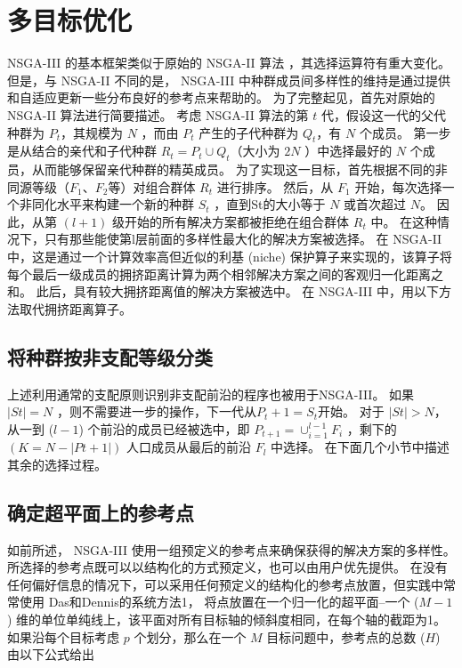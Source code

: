 \section{多目标优化}
NSGA-III 的基本框架类似于原始的 NSGA-II 算法 \cite{NSGA2}，其选择运算符有重大变化。
但是，与 NSGA-II 不同的是， NSGA-III 中种群成员间多样性的维持是通过提供和自适应更新一些分布良好的参考点来帮助的。
为了完整起见，首先对原始的 NSGA-II 算法进行简要描述。
考虑 NSGA-II 算法的第 $t$ 代，假设这一代的父代种群为 $P_t$，其规模为 $N$ ，而由 $P_t$ 产生的子代种群为 $Q_t$，有 $N$ 个成员。
第一步是从结合的亲代和子代种群 $R_t = P_t \cup Q_t$（大小为 $2N$ ）中选择最好的 $N$ 个成员，从而能够保留亲代种群的精英成员。
为了实现这一目标，首先根据不同的非同源等级（$F_1$、$F_2$等）对组合群体 $R_t$ 进行排序。
然后，从 $F_1$ 开始，每次选择一个非同化水平来构建一个新的种群 $S_t$ ，直到St的大小等于 $N$ 或首次超过 $N$。
因此，从第 $(l+1)$ 级开始的所有解决方案都被拒绝在组合群体 $R_t$ 中。
在这种情况下，只有那些能使第l层前面的多样性最大化的解决方案被选择。
在 NSGA-II 中，这是通过一个计算效率高但近似的利基 (niche) 保护算子来实现的，该算子将每个最后一级成员的拥挤距离计算为两个相邻解决方案之间的客观归一化距离之和。
此后，具有较大拥挤距离值的解决方案被选中。
在 NSGA-III 中，用以下方法取代拥挤距离算子。

\subsection{将种群按非支配等级分类}

上述利用通常的支配原则\cite{chankong1983}识别非支配前沿的程序也被用于NSGA-III。
如果 $|St|=N$ ，则不需要进一步的操作，下一代从$P_t+1=S_t$开始。
对于 $|St|>N$，从一到 ($l-1$) 个前沿的成员已经被选中，即 $P_{t+1}= \cup_{i=1}^{l-1} F_i$ ，剩下的 $(K=N-|Pt+1|)$ 人口成员从最后的前沿 $F_l$ 中选择。
在下面几个小节中描述其余的选择过程。

\subsection{确定超平面上的参考点}

如前所述， NSGA-III 使用一组预定义的参考点来确保获得的解决方案的多样性。
所选择的参考点既可以以结构化的方式预定义，也可以由用户优先提供。
在没有任何偏好信息的情况下，可以采用任何预定义的结构化的参考点放置，但实践中常常使用 Das和Dennis的\cite{das&dennis2000}系统方法1，
将点放置在一个归一化的超平面--一个 ($M-1$) 维的单位单纯线上，该平面对所有目标轴的倾斜度相同，在每个轴的截距为1。
如果沿每个目标考虑 $p$ 个划分，那么在一个 $M$ 目标问题中，参考点的总数 ($H$) 由以下公式给出

